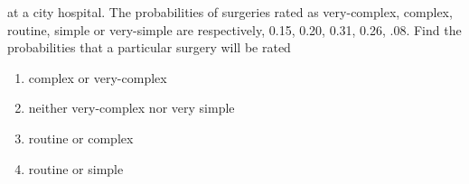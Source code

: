 \begin{enumerate}[label=\thesubsection.\arabic*,ref=\thesubsection.\theenumi]
at a city hospital. The probabilities of surgeries rated as very-complex, complex,
routine, simple or very-simple are respectively, 0.15, 0.20, 0.31, 0.26, .08. Find
the probabilities that a particular surgery will be rated
\begin{enumerate}
\item complex or very-complex
\item neither very-complex nor very simple
\item routine or complex
\item routine or simple
\end{enumerate}
		\solution
		
\end{enumerate}
